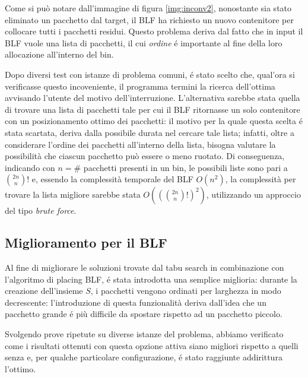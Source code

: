Come si può notare dall'immagine di figura \ref{img:inconv2}, nonostante sia stato eliminato un pacchetto dal target, il BLF ha richiesto un nuovo contenitore per collocare tutti i pacchetti residui. Questo problema deriva dal fatto che in input il BLF vuole una lista di pacchetti, il cui \textit{ordine} é importante al fine della loro allocazione all'interno del bin.

Dopo diversi test con istanze di problema comuni, é stato scelto che, qual'ora si verificasse questo incoveniente, il programma termini la ricerca dell'ottima avvisando l'utente del motivo dell'interruzione. L'alternativa sarebbe stata quella di trovare una lista di pacchetti tale per cui il BLF ritornasse un solo contenitore con un posizionamento ottimo dei pacchetti: il motivo per la quale questa scelta é stata scartata, deriva dalla possibile durata nel cercare tale lista; infatti, oltre a considerare l'ordine dei pacchetti all'interno della lista, bisogna valutare la possibilità che ciascun pacchetto può essere o meno ruotato. Di conseguenza, indicando con $n = \#$ pacchetti presenti in un bin, le possibili liste sono pari a $\binom{2n}{n}!$ e, essendo la complessità temporale del BLF $O(n^2)$, la complessità per trovare la lista migliore sarebbe stata $O\left((\binom{2n}{n}!)^2\right)$, utilizzando un approccio del tipo \textit{brute force}.

\subsection{Miglioramento per il BLF}
Al fine di migliorare le soluzioni trovate dal tabu search in combinazione con l'algoritmo di placing BLF, é stata introdotta una semplice miglioria: durante la creazione dell'insieme $S$, i pacchetti vengono ordinati per larghezza in modo decrescente: l'introduzione di questa funzionalità deriva dall'idea che un pacchetto grande é più difficile da spostare rispetto ad un pacchetto piccolo.

Svolgendo prove ripetute su diverse istanze del problema, abbiamo verificato come i risultati ottenuti con questa opzione attiva siano migliori rispetto a quelli senza e, per qualche particolare configurazione, é stato raggiunte addirittura l'ottimo.
